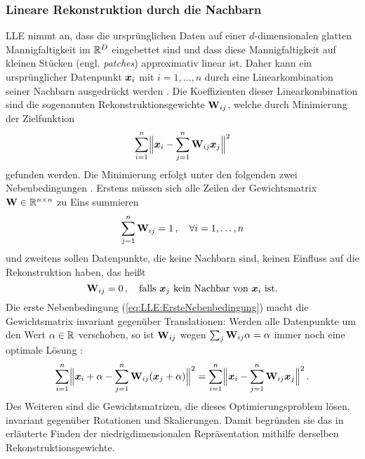 \subsubsection{Lineare Rekonstruktion durch die Nachbarn}
\label{ch:MethodenDerDimRed:statistisch:LLE:LineareRekonstruktion}
LLE nimmt an, dass die ursprünglichen Daten auf einer $d$-dimensionalen glatten Mannigfaltigkeit im $\real^D$ eingebettet sind und dass diese Mannigfaltigkeit auf kleinen Stücken (engl. \textit{patches}) approximativ linear ist. Daher kann ein ursprünglicher Datenpunkt $\vect{x}_i$ mit $i = 1,\ldots,n$ durch eine Linearkombination seiner Nachbarn
ausgedrückt werden \parencite[2323]{Roweis.2000}. Die Koeffizienten dieser Linearkombination sind die sogenannten
Rekonstruktionsgewichte $\mat{W}_{ij}$, welche durch Minimierung der Zielfunktion
\begin{equation}
	\label{eq:LLE:Zielfunktion}
	\sum_{i = 1}^n \norm[\Big]{ \vect{x}_i - \sum_{j = 1}^n \mat{W}_{ij}\vect{x}_j}^2
\end{equation}
gefunden werden. Die Minimierung erfolgt unter den folgenden zwei Nebenbedingungen \parencite[2]{Roweis.2000}. Erstens müssen sich alle Zeilen der Gewichtsmatrix $\mat{W} \in \real^{n
		\times n}$ zu Eins summieren
\begin{equation}
	\label{eq:LLE:ErsteNebenbedingung}
	\sum_{j = 1}^n\mat{W}_{ij} = 1 \, , \quad \forall i = 1, \ldots, n
\end{equation}
und zweitens sollen Datenpunkte, die keine Nachbarn sind, keinen Einfluss auf die Rekonstruktion haben, das heißt
\begin{equation}
	\label{eq:LLE:ZweiteNebenbedingung}
	\mat{W}_{ij} = 0 \, , \quad \text{falls } \vect{x}_j \text{ kein Nachbar von } \vect{x}_i \text{ ist.}
\end{equation}
Die erste Nebenbedingung (\eqref{eq:LLE:ErsteNebenbedingung}) macht die Gewichtsmatrix invariant gegenüber Translationen: Werden alle Datenpunkte um den Wert $\alpha \in \real$ verschoben, so ist $\mat{W}_{ij}$ wegen $\sum_j \mat{W}_{ij}\alpha = \alpha$ immer noch eine optimale Lösung \parencite[8]{Cayton.2005}:
\begin{equation}
	\sum_{i = 1}^n \norm[\Big]{ \vect{x}_i + \alpha - \sum_{j = 1}^n \mat{W}_{ij}(\vect{x}_j + \alpha)}^2 = \sum_{i = 1}^n \norm[\Big]{ \vect{x}_i - \sum_{j = 1}^n \mat{W}_{ij}\vect{x}_j}^2 \, .
\end{equation}
Des Weiteren sind die Gewichtsmatrizen, die dieses Optimierungsproblem lösen, invariant gegenüber Rotationen und Skalierungen. Damit begründen sie das in  erläuterte Finden der niedrigdimensionalen Repräsentation mithilfe derselben Rekonstruktionsgewichte.

